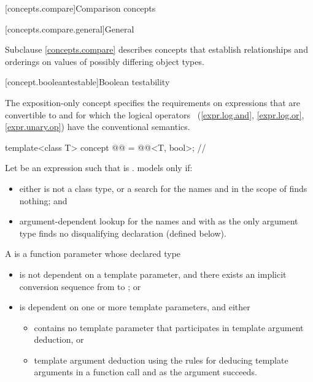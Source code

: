 [concepts.compare]{Comparison concepts}

[concepts.compare.general]{General}

\pnum
Subclause \ref{concepts.compare} describes concepts that establish relationships and orderings
on values of possibly differing object types.

[concept.booleantestable]{Boolean testability}

\pnum
The exposition-only  concept
specifies the requirements on expressions
that are convertible to  and
for which the logical operators~%
(\ref{expr.log.and}, \ref{expr.log.or}, \ref{expr.unary.op})
have the conventional semantics.

\begin{itemdecl}
template<class T>
  concept @@ = @@<T, bool>;  // \expos
\end{itemdecl}

\pnum
Let  be an expression such that
 is .
 models  only if:
\begin{itemize}
\item
either  is not a class type, or
a search for the names  and 
in the scope of 
finds nothing; and

\item
argument-dependent lookup
for the names  and 
with  as the only argument type
finds no disqualifying declaration (defined below).
\end{itemize}

\pnum
A 
is a function parameter whose declared type 
\begin{itemize}
\item
is not dependent on a template parameter, and
there exists an implicit conversion sequence
from  to ; or

\item
is dependent on one or more template parameters, and either
\begin{itemize}
\item
{} contains no template parameter that
participates in template argument deduction, or
\item
template argument deduction
using the rules for deducing template arguments
in a function call and
 as the argument succeeds.
\end{itemize}
\end{itemize}

